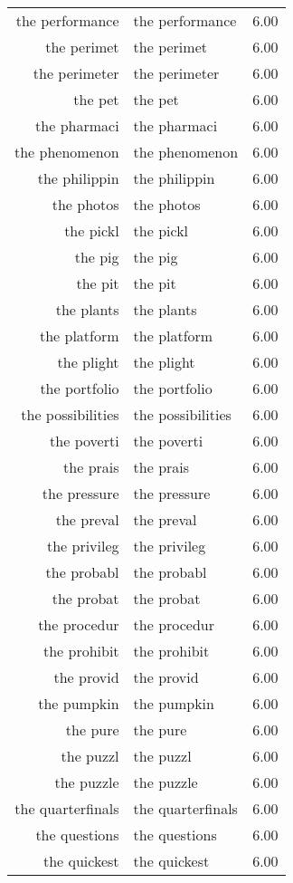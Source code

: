 \begin{table}[ht]
\begin{tabular}{rlr}
  the performance & the performance & 6.00 \\ 
  the perimet & the perimet & 6.00 \\ 
  the perimeter & the perimeter & 6.00 \\ 
  the pet & the pet & 6.00 \\ 
  the pharmaci & the pharmaci & 6.00 \\ 
  the phenomenon & the phenomenon & 6.00 \\ 
  the philippin & the philippin & 6.00 \\ 
  the photos & the photos & 6.00 \\ 
  the pickl & the pickl & 6.00 \\ 
  the pig & the pig & 6.00 \\ 
  the pit & the pit & 6.00 \\ 
  the plants & the plants & 6.00 \\ 
  the platform & the platform & 6.00 \\ 
  the plight & the plight & 6.00 \\ 
  the portfolio & the portfolio & 6.00 \\ 
  the possibilities & the possibilities & 6.00 \\ 
  the poverti & the poverti & 6.00 \\ 
  the prais & the prais & 6.00 \\ 
  the pressure & the pressure & 6.00 \\ 
  the preval & the preval & 6.00 \\ 
  the privileg & the privileg & 6.00 \\ 
  the probabl & the probabl & 6.00 \\ 
  the probat & the probat & 6.00 \\ 
  the procedur & the procedur & 6.00 \\ 
  the prohibit & the prohibit & 6.00 \\ 
  the provid & the provid & 6.00 \\ 
  the pumpkin & the pumpkin & 6.00 \\ 
  the pure & the pure & 6.00 \\ 
  the puzzl & the puzzl & 6.00 \\ 
  the puzzle & the puzzle & 6.00 \\ 
  the quarterfinals & the quarterfinals & 6.00 \\ 
  the questions & the questions & 6.00 \\ 
  the quickest & the quickest & 6.00 \\ 

\end{tabular}
\end{table}
